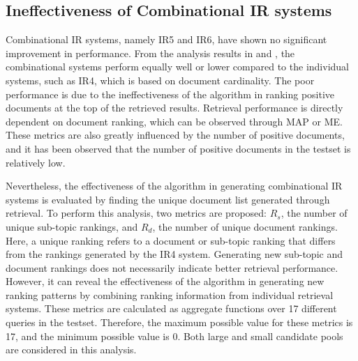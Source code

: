 \subsection{Ineffectiveness of Combinational IR systems}

Combinational \ac{IR} systems, namely IR5 and IR6, have shown no significant improvement in performance. From the analysis results in  and , the combinational systems perform equally well or lower compared to the individual systems, such as IR4, which is based on document cardinality. The poor performance is due to the ineffectiveness of the algorithm in ranking positive documents at the top of the retrieved results. Retrieval performance is directly dependent on document ranking, which can be observed through \ac{MAP} or \ac{ME}. These metrics are also greatly influenced by the number of positive documents, and it has been observed that the number of positive documents in the testset is relatively low.

Nevertheless, the effectiveness of the algorithm in generating combinational \ac{IR} systems is evaluated by finding the unique document list generated through retrieval. To perform this analysis, two metrics are proposed: $R_s$, the number of unique sub-topic rankings, and $R_d$, the number of unique document rankings. Here, a unique ranking refers to a document or sub-topic ranking that differs from the rankings generated by the IR4 system. Generating new sub-topic and document rankings does not necessarily indicate better retrieval performance. However, it can reveal the effectiveness of the algorithm in generating new ranking patterns by combining ranking information from individual retrieval systems. These metrics are calculated as aggregate functions over 17 different queries in the testset. Therefore, the maximum possible value for these metrics is 17, and the minimum possible value is 0. Both large and small candidate pools are considered in this analysis.

